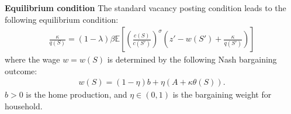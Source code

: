 \noindent\textbf{Equilibrium condition}\hspace{3mm} The standard vacancy posting condition leads to the following equilibrium condition:
\begin{align*}
  \frac{\kappa}{q(S)} = (1-\lambda)\beta\mathbb{E}\left[\left(\frac{c(S)}{c(S')}\right)^{\sigma}
  \left(z' - w(S') + \frac{\kappa}{q(S')}\right)\right]
\end{align*}
where the wage $w=w(S)$ is determined by the following Nash bargaining outcome:
\begin{align*}
  w(S) = (1-\eta)b + \eta (A + \kappa\theta(S)).
\end{align*}
$b>0$ is the home production, and $\eta\in(0,1)$ is the bargaining weight for household.
